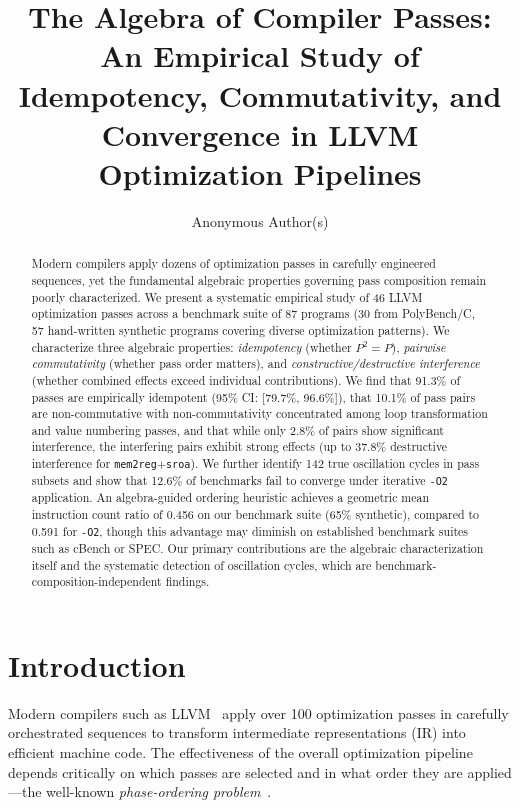 \documentclass[11pt]{article}
\title{The Algebra of Compiler Passes: An Empirical Study of Idempotency, Commutativity, and Convergence in LLVM Optimization Pipelines}
\author{
  Anonymous Author(s)
}
\begin{document}
\maketitle

\begin{abstract}
Modern compilers apply dozens of optimization passes in carefully engineered sequences, yet the fundamental algebraic properties governing pass composition remain poorly characterized. We present a systematic empirical study of 46 LLVM optimization passes across a benchmark suite of 87 programs (30 from PolyBench/C, 57 hand-written synthetic programs covering diverse optimization patterns). We characterize three algebraic properties: \emph{idempotency} (whether $P^2 = P$), \emph{pairwise commutativity} (whether pass order matters), and \emph{constructive/destructive interference} (whether combined effects exceed individual contributions). We find that 91.3\% of passes are empirically idempotent (95\% CI: [79.7\%, 96.6\%]), that 10.1\% of pass pairs are non-commutative with non-commutativity concentrated among loop transformation and value numbering passes, and that while only 2.8\% of pairs show significant interference, the interfering pairs exhibit strong effects (up to 37.8\% destructive interference for \texttt{mem2reg}$+$\texttt{sroa}). We further identify 142 true oscillation cycles in pass subsets and show that 12.6\% of benchmarks fail to converge under iterative \texttt{-O2} application. An algebra-guided ordering heuristic achieves a geometric mean instruction count ratio of 0.456 on our benchmark suite (65\% synthetic), compared to 0.591 for \texttt{-O2}, though this advantage may diminish on established benchmark suites such as cBench or SPEC. Our primary contributions are the algebraic characterization itself and the systematic detection of oscillation cycles, which are benchmark-composition-independent findings.
\end{abstract}

\section{Introduction}

Modern compilers such as LLVM~\citep{lattner2004llvm} apply over 100 optimization passes in carefully orchestrated sequences to transform intermediate representations (IR) into efficient machine code. The effectiveness of the overall optimization pipeline depends critically on which passes are selected and in what order they are applied---the well-known \emph{phase-ordering problem}~\citep{kulkarni2012mitigating}.
\end{document}
